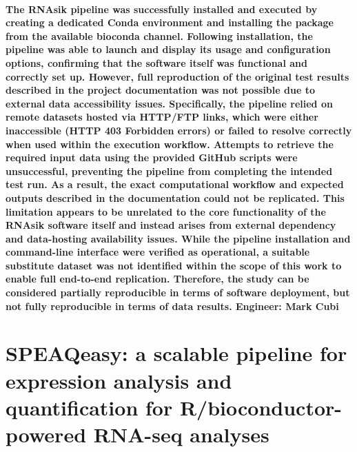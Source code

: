 \documentclass{article}
\begin{document}
\paragraph{
    The RNAsik pipeline was successfully installed and executed by creating a dedicated Conda environment and installing the package from the available bioconda channel. Following installation, the pipeline was able to launch and display its usage and configuration options, confirming that the software itself was functional and correctly set up. However, full reproduction of the original test results described in the project documentation was not possible due to external data accessibility issues. Specifically, the pipeline relied on remote datasets hosted via HTTP/FTP links, which were either inaccessible (HTTP 403 Forbidden errors) or failed to resolve correctly when used within the execution workflow. Attempts to retrieve the required input data using the provided GitHub scripts were unsuccessful, preventing the pipeline from completing the intended test run. As a result, the exact computational workflow and expected outputs described in the documentation could not be replicated. This limitation appears to be unrelated to the core functionality of the RNAsik software itself and instead arises from external dependency and data-hosting availability issues. While the pipeline installation and command-line interface were verified as operational, a suitable substitute dataset was not identified within the scope of this work to enable full end-to-end replication. Therefore, the study can be considered partially reproducible in terms of software deployment, but not fully reproducible in terms of data results. Engineer: Mark Cubi
}

\section{SPEAQeasy: a scalable pipeline for expression analysis and quantification for R/bioconductor-powered RNA-seq analyses \cite{Eagles2021SPEAQeasy}}
\end{document}
